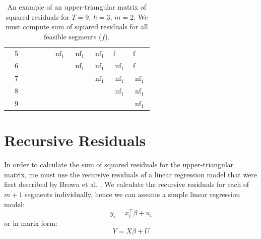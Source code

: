 \documentclass[main.tex]{subfiles}
\begin{document}
\begin{table}[]
\begin{tabular}{lllllllllll}
\multicolumn{1}{l|}{}              & \multicolumn{1}{l|}{5} & \multicolumn{1}{l|}{}     & \multicolumn{1}{l|}{}     & \multicolumn{1}{l|}{}     & \multicolumn{1}{l|}{}     & \multicolumn{1}{l|}{$\operatorname{nf}_1$} & \multicolumn{1}{l|}{$\operatorname{nf}_1$} & \multicolumn{1}{l|}{$\operatorname{nf}_1$} & \multicolumn{1}{l|}{f}   & \multicolumn{1}{l|}{f}   \\ \cline{2-11} 
\multicolumn{1}{l|}{}              & \multicolumn{1}{l|}{6} & \multicolumn{1}{l|}{}     & \multicolumn{1}{l|}{}     & \multicolumn{1}{l|}{}     & \multicolumn{1}{l|}{}     & \multicolumn{1}{l|}{}     & \multicolumn{1}{l|}{$\operatorname{nf}_1$} & \multicolumn{1}{l|}{$\operatorname{nf}_1$} & \multicolumn{1}{l|}{$\operatorname{nf}_1$} & \multicolumn{1}{l|}{f}   \\ \cline{2-11} 
\multicolumn{1}{l|}{}              & \multicolumn{1}{l|}{7} & \multicolumn{1}{l|}{}     & \multicolumn{1}{l|}{}     & \multicolumn{1}{l|}{}     & \multicolumn{1}{l|}{}     & \multicolumn{1}{l|}{}     & \multicolumn{1}{l|}{}     & \multicolumn{1}{l|}{$\operatorname{nf}_1$} & \multicolumn{1}{l|}{$\operatorname{nf}_1$} & \multicolumn{1}{l|}{$\operatorname{nf}_1$} \\ \cline{2-11} 
\multicolumn{1}{l|}{}              & \multicolumn{1}{l|}{8} & \multicolumn{1}{l|}{}     & \multicolumn{1}{l|}{}     & \multicolumn{1}{l|}{}     & \multicolumn{1}{l|}{}     & \multicolumn{1}{l|}{}     & \multicolumn{1}{l|}{}     & \multicolumn{1}{l|}{}     & \multicolumn{1}{l|}{$\operatorname{nf}_1$} & \multicolumn{1}{l|}{$\operatorname{nf}_1$} \\ \cline{2-11} 
\multicolumn{1}{l|}{}              & \multicolumn{1}{l|}{9} & \multicolumn{1}{l|}{}     & \multicolumn{1}{l|}{}     & \multicolumn{1}{l|}{}     & \multicolumn{1}{l|}{}     & \multicolumn{1}{l|}{}     & \multicolumn{1}{l|}{}     & \multicolumn{1}{l|}{}     & \multicolumn{1}{l|}{}     & \multicolumn{1}{l|}{$\operatorname{nf}_1$} \\ \cline{2-11} 
\end{tabular}
\caption{An example of an upper-triangular matrix of squared residuals for $T =
  9$, $h=3$, $m=2$. We must compute sum of squared residuals for all feasible
  segments ($f$).
}
\label{table_4_1}
\end{table}


\section{Recursive Residuals}
\label{sec:recursive_residuals}
In order to calculate the sum of squared residuals for the upper-triangular
matrix, me must use the recursive residuals of a linear regression model that
were first described by Brown et al. \cite{brown75}. We calculate the recursive
residuals for each of $m + 1$ segments individually, hence we can assume a
simple linear regression model:
\[
y_i = x_i^{\top} \beta + u_i
\]
or in marix form:
\[
Y = X\beta + U
\]
\end{document}
